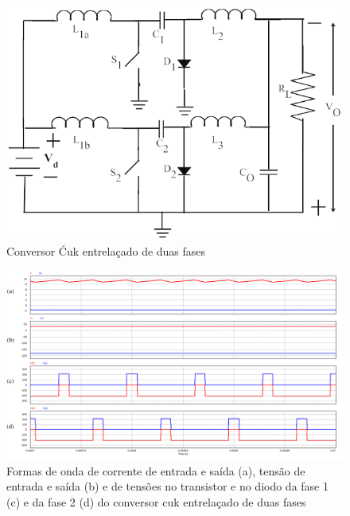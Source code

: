 \documentclass[
	12pt,				%
	openright,			%
	twoside,			%
	a4paper,			%
	english,			%
	french,				%
	spanish,			%
	brazil,				%
	]{abntex2}
\begin{document}
\begin{figure}[htbp]
	\begin{center}
		\includegraphics[width=0.55 \linewidth]{interv_cuk_circuit}
		\caption{Conversor Ćuk entrelaçado de duas fases \cite{JOSEPH_2015_Intervealed_CUK}}
		\label{fig:interv_cuk_conv} 
	\end{center}
\end{figure}


\begin{figure}[htbp]
	\captionsetup{justification=centering}
	\centering
		\includegraphics[width= \linewidth]{interv_cuk_signal_details}
		\caption{Formas de onda de corrente de entrada e saída (a), tensão de entrada e saída (b) e de tensões no transistor e no diodo da fase 1 (c) e da fase 2 (d) do conversor cuk entrelaçado de duas fases}
		\label{fig:interv_cuk_In_Out} 
\end{figure}
\end{document}

